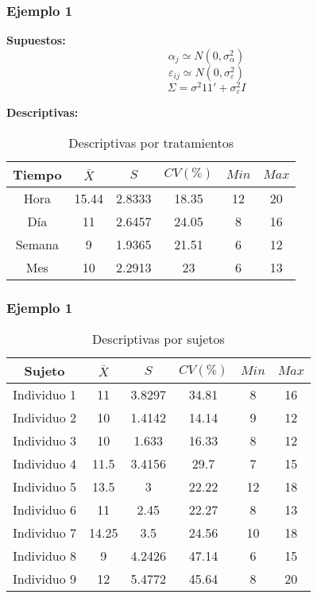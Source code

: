 \documentclass[12pt]{beamer}
\begin{document}
\begin{frame}
\frametitle{Ejemplo 1}
\textbf{Supuestos:} 
$$\alpha_j \simeq N(0,\sigma^2_\alpha)$$
$$\varepsilon_{ij} \simeq N(0,\sigma^2_\varepsilon)$$
$$\Sigma =\sigma^2 11' + \sigma^2_\varepsilon I$$

\textbf{Descriptivas:}
\begin{table}[htbp]
  \centering
\resizebox{12cm}{!} {
\begin{tabular}{|c|c|c|c|c|c|}
\hline 
\textbf{Tiempo} & \textbf{$\bar{X}$} & \textbf{$S$} & \textbf{$CV(\%)$} & \textbf{$Min$} & \textbf{$Max$}\\ 
\hline 
Hora & 15.44 &2.8333& 18.35& 12 & 20\\
Día & 11 & 2.6457 & 24.05& 8 & 16\\
Semana & 9 &1.9365& 21.51& 6 & 12\\
Mes & 10 &2.2913& 23& 6 & 13 \\
\hline 
\end{tabular} 
}
\caption{Descriptivas por tratamientos}
\label{tab:addlabel}%
\end{table}%
\end{frame}

\begin{frame}
\frametitle{Ejemplo 1}
\begin{table}[htbp]
  \centering
\resizebox{12cm}{!} {
\begin{tabular}{|c|c|c|c|c|c|}
\hline 
\textbf{Sujeto} & \textbf{$\bar{X}$} & \textbf{$S$} & \textbf{$CV(\%)$} & \textbf{$Min$} & \textbf{$Max$}\\ 
\hline 
Individuo 1 & 11 &3.8297 &34.81& 8 & 16\\
Individuo 2 & 10 &1.4142 & 14.14& 9 & 12\\
Individuo 3 & 10 &1.633 & 16.33& 8 & 12\\
Individuo 4 & 11.5    &3.4156 & 29.7& 7 & 15\\
Individuo 5 & 13.5    &3 & 22.22& 12 & 18\\
Individuo 6 & 11    &2.45 & 22.27& 8 & 13\\
Individuo 7 & 14.25    &3.5 &24.56& 10 & 18\\
Individuo 8 &  9   &4.2426 & 47.14& 6 & 15\\
Individuo 9 &12    &5.4772 & 45.64& 8 & 20\\
\hline 
\end{tabular} 
}
\caption{Descriptivas por sujetos}
\label{tab:addlabel}%
\end{table}%
\end{frame}
\end{document}

